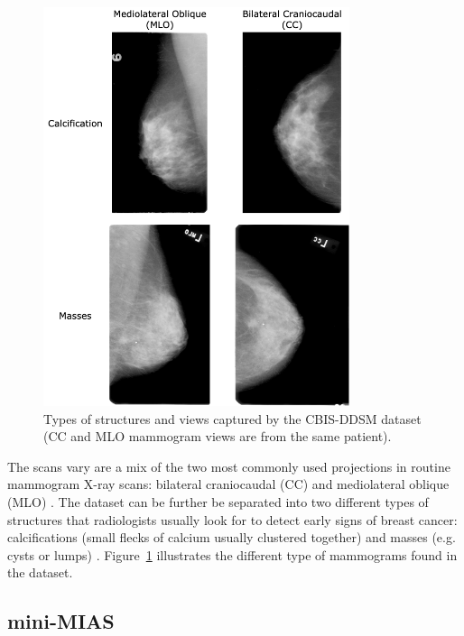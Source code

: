 \begin{figure}[ht]
\centerline{\includegraphics[width=0.8\textwidth]{figures/ethics-datasets/CBIS-DDSM views_types.png}}
\caption{\label{fig:ethics-datasets-CBIS-DDSM views_types}Types of structures and views captured by the CBIS-DDSM dataset (CC and MLO mammogram views are from the same patient).}
\end{figure}

The scans vary are a mix of the two most commonly used projections in routine mammogram X-ray scans: bilateral craniocaudal (CC) and mediolateral oblique (MLO) \citep{Elter2009}. The dataset can be further be separated into two different types of structures that radiologists usually look for to detect early signs of breast cancer: calcifications (small flecks of calcium usually clustered together) and masses (e.g. cysts or lumps) \citep{breastcancerorg2018}. Figure~\ref{fig:ethics-datasets-CBIS-DDSM views_types} illustrates the different type of mammograms found in the dataset.

\subsection{mini-MIAS}
\label{sec:ethics-mini-MIAS-dataset-description}

